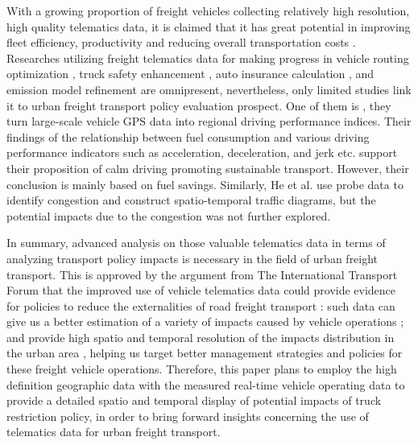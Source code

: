 \documentclass[preprint,12pt,3p]{elsarticle}
\begin{document}
With a growing proportion of freight vehicles collecting relatively high resolution, high quality telematics data, it is claimed that it has great potential in improving fleet efficiency, productivity and reducing overall transportation costs \cite{RN62,RN154}. Researches utilizing freight telematics data for making progress in vehicle routing optimization \cite{RN146}, truck safety enhancement \cite{RN155}, auto insurance calculation \cite{RN83}, and emission model refinement \cite{RN182} are omnipresent, nevertheless, only limited studies link it to urban freight transport policy evaluation prospect. One of them is \cite{RN78}, they turn large-scale vehicle GPS data into regional driving performance indices. Their findings of the relationship between fuel consumption and various driving performance indicators such as acceleration, deceleration, and jerk etc. support their proposition of calm driving promoting sustainable transport. However, their conclusion is mainly based on fuel savings. Similarly, He et al. \cite{RN149} use probe data to identify congestion and construct spatio-temporal traffic diagrams, but the potential impacts due to the congestion was not further explored. 

In summary, advanced analysis on those valuable telematics data in terms of analyzing transport policy impacts is necessary in the field of urban freight transport. This is approved by the argument from The International Transport Forum that the improved use of vehicle telematics data could provide evidence for policies to reduce the externalities of road freight transport \cite{RN166}: such data can give us a better estimation of a variety of impacts caused by vehicle operations \cite{RN155,RN167}; and provide high spatio and temporal resolution of the impacts distribution in the urban area \cite{RN168,RN169,RN170}, helping us target better management strategies and policies for these freight vehicle operations. Therefore, this paper plans to employ the high definition geographic data with the measured real-time vehicle operating data to provide a detailed spatio and temporal display of potential impacts of truck restriction policy, in order to bring forward insights concerning the use of telematics data for urban freight transport.
\end{document}
